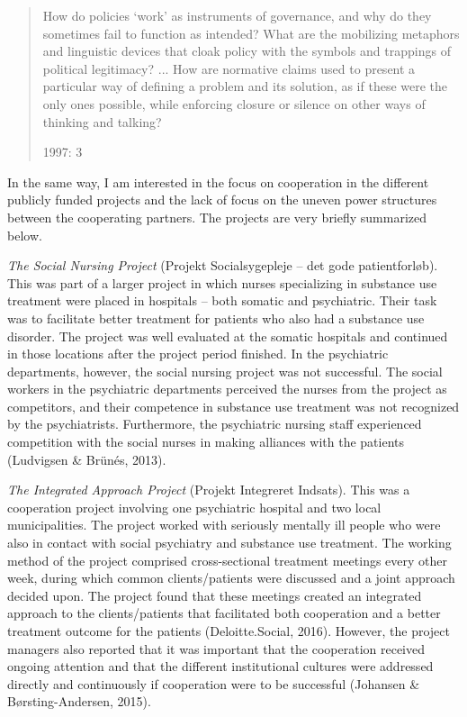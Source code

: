 \begin{multicols}{2}
    \blockquote[1997: 3]{How do policies ‘work’ as instruments of governance, and why do they sometimes fail to function as intended? What are the mobilizing metaphors and linguistic devices that cloak policy with the symbols and trappings of political legitimacy? ... How are normative claims used to present a particular way of defining a problem and its solution, as if these were the only ones possible, while enforcing closure or silence on other ways of thinking and talking?}
In the same way, I am interested in the focus on cooperation in the different publicly funded projects and the lack of focus on the uneven power structures between the cooperating partners. The projects are very briefly summarized below.
\par
\textit{The Social Nursing Project} (Projekt Socialsygepleje – det gode patientforløb). This was part of a larger project in which nurses specializing in substance use treatment were placed in hospitals – both somatic and psychiatric. Their task was to facilitate better treatment for patients who also had a substance use disorder. The project was well evaluated at the somatic hospitals and continued in those locations after the project period finished. In the psychiatric departments, however, the social nursing project was not successful. The social workers in the psychiatric departments perceived the nurses from the project as competitors, and their competence in substance use treatment was not recognized by the psychiatrists. Furthermore, the psychiatric nursing staff experienced competition with the social nurses in making alliances with the patients (Ludvigsen \& Brünés, 2013).
\par
\textit{The Integrated Approach Project} (Projekt Integreret Indsats). This was a cooperation project involving one psychiatric hospital and two local municipalities. The project worked with seriously mentally ill people who were also in contact with social psychiatry and substance use treatment. The working method of the project comprised cross-sectional treatment meetings every other week, during which common clients/patients were discussed and a joint approach decided upon. The project found that these meetings created an integrated approach to the clients/patients that facilitated both cooperation and a better treatment outcome for the patients (Deloitte.Social, 2016). However, the project managers also reported that it was important that the cooperation received ongoing attention and that the different institutional cultures were addressed directly and continuously if cooperation were to be successful (Johansen \& Børsting-Andersen, 2015).

\end{multicols}
